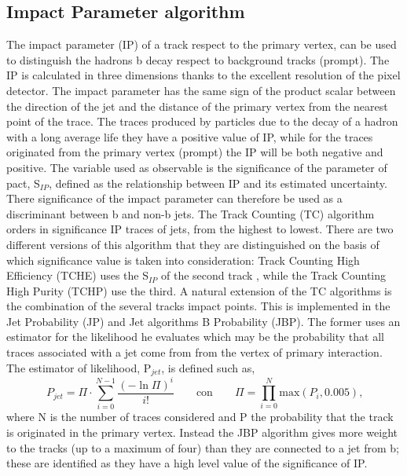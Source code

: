 \subsection*{Impact Parameter algorithm}
The impact parameter (IP) of a track respect to the primary vertex, can be used to distinguish 
the hadrons b decay  respect to background tracks (prompt). The IP is calculated in three dimensions 
thanks to the excellent resolution of the pixel detector.
The impact parameter has the same sign of the product scalar between the direction of the
jet and the distance of the primary vertex from the nearest point of the trace. The traces
produced by particles due to the decay of a hadron with a long average life
they have a positive value of IP, while for the traces originated from the primary vertex
(prompt) the IP will be both negative and positive.
The variable used as observable is the significance of the parameter of
pact, S$_{IP}$, defined as the relationship between IP and its estimated uncertainty. There
significance of the impact parameter can therefore be used as a discriminant  between b and non-b jets.
The Track Counting (TC) algorithm orders in significance
IP traces of jets, from the highest to lowest. There are two different versions of this algorithm that
they are distinguished on the basis of which significance value is taken into consideration:
Track Counting High Efficiency (TCHE) uses the S$_{IP}$ of the second track , while the Track Counting High Purity (TCHP) use the third.
A natural extension of the TC algorithms is the combination of the several tracks impact points. 
This is implemented in the Jet Probability (JP) and Jet algorithms
B Probability (JBP). The former uses an estimator for the likelihood he evaluates
which may be the probability that all traces associated with a jet come from
from the vertex of primary interaction. The estimator of likelihood, P$_{jet}$, is defined
such as,
\begin{equation}
P_{jet}=\Pi \cdot \sum_{i=0} ^{N-1} \frac{(-\ln \Pi)^i}{i!} \qquad \mbox{con} \qquad \Pi= \prod_{i=0} ^{N}\mbox{max}(P_i, 0.005)  \mbox{,}\end{equation} 
where N is the number of traces considered and P  the probability that the track is
originated in the primary vertex.
Instead the JBP algorithm gives more weight to the tracks (up to a maximum of four) than
they are connected to a jet from b; these are identified as they have a high level
value of the significance of IP.


